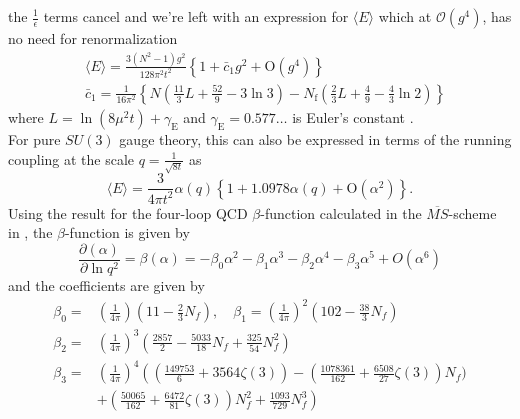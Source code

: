 \documentclass[a4paper,10pt]{article}
\begin{document}
the $\frac{1}{\epsilon}$ terms cancel and we're left with an expression for $\langle  E \rangle$ which at $\mathcal{O}(g^4)$, has no need for renormalization
\begin{equation}
\begin{aligned}
&\langle E\rangle=\frac{3\left(N^{2}-1\right) g^{2}}{128 \pi^{2} t^{2}}\left\{1+\bar{c}_{1} g^{2}+\mathrm{O}\left(g^{4}\right)\right\} \\
&\bar{c}_{1}=\frac{1}{16 \pi^{2}}\left\{N\left(\frac{11}{3} L+\frac{52}{9}-3 \ln 3\right)-N_{\mathrm{f}}\left(\frac{2}{3} L+\frac{4}{9}-\frac{4}{3} \ln 2\right)\right\}
\end{aligned}
\end{equation}
where $L=\ln \left(8 \mu^{2} t\right)+\gamma_{\mathrm{E}}$ and $\gamma_{\mathrm{E}}=0.577\ldots$ is Euler's constant  \cite{Luscher2010}.\\For pure $SU(3)$ gauge theory, this can also be expressed in terms of the running coupling at the scale $q=\frac{1}{\sqrt{8t}}$ as
\begin{equation}\label{eq:leadingOrder_pt_E}
\langle E\rangle=\frac{3}{4 \pi t^{2}} \alpha(q)\left\{1+1.0978\alpha(q)+\mathrm{O}\left(\alpha^{2}\right)\right\}.
\end{equation}
Using the result for the four-loop QCD $\beta$-function calculated in the $\overline{MS}$-scheme in \cite{vanRitbergenT1997}, the $\beta$-function is given by
\begin{equation}
\frac{\partial \left( \alpha\right)}{\partial \ln q^{2}}=\beta\left(\alpha\right)=-\beta_{0} \alpha^{2}-\beta_{1} \alpha^{3}-\beta_{2} \alpha^{4}-\beta_{3} \alpha^{5}+O\left(\alpha^{6}\right)
\end{equation}
and the coefficients are given by
\begin{equation}
\begin{aligned}
\beta_{0}=&\left( \frac{1}{4\pi} \right)\left( 11-\frac{2}{3} N_{f} \right), \quad \beta_{1}=\left( \frac{1}{4\pi} \right)^2\left( 102-\frac{38}{3} N_{f} \right)\\ \beta_{2}=&\left( \frac{1}{4\pi} \right)^3\left( \frac{2857}{2}-\frac{5033}{18} N_{f}+\frac{325}{54} N_{f}^{2} \right)\\ \beta_{3}=&\left( \frac{1}{4\pi} \right)^4\left(\left(\frac{149753}{6}+3564 \zeta(3)\right)-\left(\frac{1078361}{162}+\frac{6508}{27} \zeta(3)\right) N_{f})\right.\\&\left.+\left(\frac{50065}{162}+\frac{6472}{81} \zeta(3)\right) N_{f}^{2}+\frac{1093}{729} N_{f}^{3}\right)
\end{aligned}
\end{equation}
\end{document}
